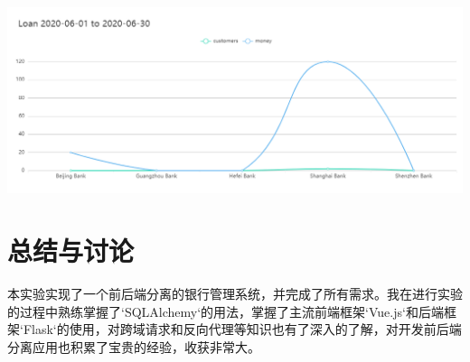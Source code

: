\documentclass{article}
\begin{document}
	\includegraphics*[scale=0.4]{23.png}\\
	\section{总结与讨论}
	本实验实现了一个前后端分离的银行管理系统，并完成了所有需求。我在进行实验的过程中熟练掌握了`SQLAlchemy`的用法，掌握了主流前端框架`Vue.js`和后端框架`Flask`的使用，对跨域请求和反向代理等知识也有了深入的了解，对开发前后端分离应用也积累了宝贵的经验，收获非常大。
\end{document}
